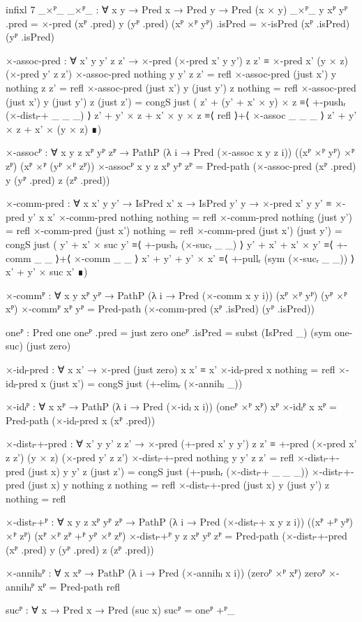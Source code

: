\begin{code}[hide]
  infixl 7 _×ᴾ_
  _×ᴾ_ : ∀ {x y} → Pred x → Pred y → Pred (x × y)
  _×ᴾ_ {y} xᴾ yᴾ .pred = ×-pred (xᴾ .pred) y (yᴾ .pred)
  (xᴾ ×ᴾ yᴾ) .isPred = ×-isPred (xᴾ .isPred) (yᴾ .isPred)

  ×-assoc-pred :
    ∀ x' y y' z z' →
    ×-pred (×-pred x' y y') z z' ≡ ×-pred x' (y × z) (×-pred y' z z')
  ×-assoc-pred nothing y y' z z' = refl
  ×-assoc-pred (just x') y nothing z z' = refl
  ×-assoc-pred (just x') y (just y') z nothing = refl
  ×-assoc-pred (just x') y (just y') z (just z') =
    congS just
      ( z' + (y' + x' × y) × z     ≡⟨ +-pushᵣ (×-distₗ-+ _ _ _) ⟩
        z' + y' × z + x' × y × z   ≡⟨ refl ⟩+⟨ ×-assoc _ _ _ ⟩
        z' + y' × z + x' × (y × z) ∎)

  ×-assocᴾ : ∀ {x y z} xᴾ yᴾ zᴾ →
    PathP (λ i → Pred (×-assoc x y z i)) ((xᴾ ×ᴾ yᴾ) ×ᴾ zᴾ) (xᴾ ×ᴾ (yᴾ ×ᴾ zᴾ))
  ×-assocᴾ {x} {y} {z} xᴾ yᴾ zᴾ =
    Pred-path (×-assoc-pred (xᴾ .pred) y (yᴾ .pred) z (zᴾ .pred))

  ×-comm-pred :
    ∀ {x x' y y'} → IsPred x' x → IsPred y' y →
    ×-pred x' y y' ≡ ×-pred y' x x'
  ×-comm-pred nothing nothing = refl
  ×-comm-pred nothing (just y') = refl
  ×-comm-pred (just x') nothing = refl
  ×-comm-pred (just x') (just y') =
    congS just
      ( y' + x' × suc y'   ≡⟨ +-pushᵣ (×-sucᵣ _ _) ⟩
        y' + x' + x' × y' ≡⟨ +-comm _ _ ⟩+⟨ ×-comm _ _ ⟩
        x' + y' + y' × x' ≡⟨ +-pullᵣ (sym (×-sucᵣ _ _)) ⟩
        x' + y' × suc x' ∎)

  ×-commᴾ :
    ∀ {x y} xᴾ yᴾ → PathP (λ i → Pred (×-comm x y i)) (xᴾ ×ᴾ yᴾ) (yᴾ ×ᴾ xᴾ)
  ×-commᴾ xᴾ yᴾ = Pred-path (×-comm-pred (xᴾ .isPred) (yᴾ .isPred))

  oneᴾ : Pred one
  oneᴾ .pred = just zero
  oneᴾ .isPred = subst (IsPred _) (sym one-suc) (just zero)

  ×-idₗ-pred : ∀ x x' → ×-pred (just zero) x x' ≡ x'
  ×-idₗ-pred x nothing = refl
  ×-idₗ-pred x (just x') = congS just (+-elimᵣ (×-annihₗ _))

  ×-idₗᴾ : ∀ {x} xᴾ → PathP (λ i → Pred (×-idₗ x i)) (oneᴾ ×ᴾ xᴾ) xᴾ
  ×-idₗᴾ {x} xᴾ = Pred-path (×-idₗ-pred x (xᴾ .pred))

  ×-distₗ-+-pred :
    ∀ x' y y' z z' →
    ×-pred (+-pred x' y y') z z' ≡
    +-pred (×-pred x' z z') (y × z) (×-pred y' z z')
  ×-distₗ-+-pred nothing y y' z z' = refl
  ×-distₗ-+-pred (just x) y y' z (just z') =
    congS just (+-pushᵣ (×-distₗ-+ _ _ _))
  ×-distₗ-+-pred (just x) y nothing z nothing = refl
  ×-distₗ-+-pred (just x) y (just y') z nothing = refl

  ×-distₗ-+ᴾ :
    ∀ {x y z} xᴾ yᴾ zᴾ →
    PathP (λ i → Pred (×-distₗ-+ x y z i))
      ((xᴾ +ᴾ yᴾ) ×ᴾ zᴾ) (xᴾ ×ᴾ zᴾ +ᴾ yᴾ ×ᴾ zᴾ)
  ×-distₗ-+ᴾ {y} {z} xᴾ yᴾ zᴾ =
    Pred-path (×-distₗ-+-pred (xᴾ .pred) y (yᴾ .pred) z (zᴾ .pred))

  ×-annihₗᴾ : ∀ {x} xᴾ → PathP (λ i → Pred (×-annihₗ x i)) (zeroᴾ ×ᴾ xᴾ) zeroᴾ
  ×-annihₗᴾ xᴾ = Pred-path refl

  sucᴾ : ∀ {x} → Pred x → Pred (suc x)
  sucᴾ = oneᴾ +ᴾ_
\end{code}
